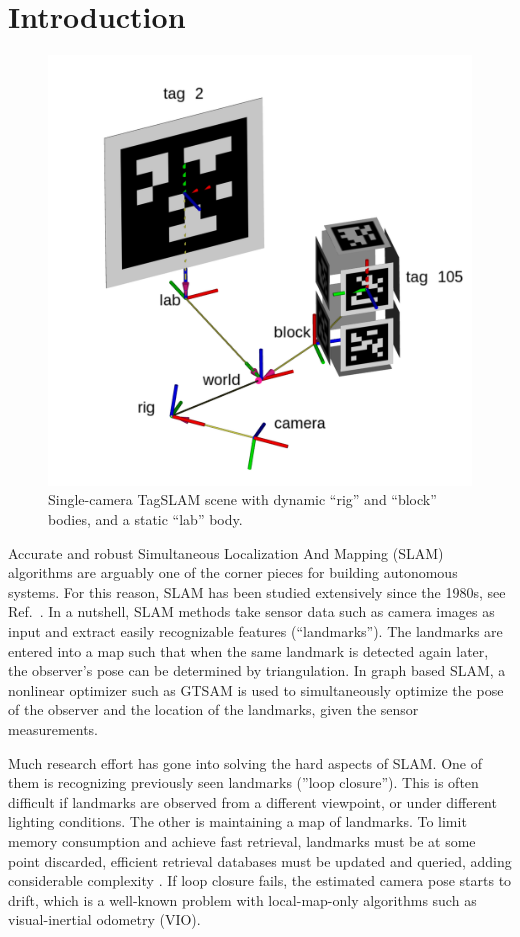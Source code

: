 \section{Introduction}
\begin{figure}[ht]
  \centering
  \includegraphics[width=\columnwidth]{scene_with_block.png}
  \caption{Single-camera TagSLAM scene with dynamic ``rig'' and ``block''
    bodies, and a static ``lab'' body.}
  \label{fig:scene_with_block}
\end{figure}

Accurate and robust Simultaneous Localization And Mapping (SLAM)
algorithms are arguably one of the corner pieces for building
autonomous systems. For this reason, SLAM has been studied extensively
since the 1980s, see Ref.\ \cite{cadena2016}. 
In a nutshell, SLAM methods take sensor data such as camera images as
input and extract easily recognizable features (``landmarks''). The
landmarks are entered into a map such that when the same landmark is
detected again later, the observer's pose can be determined by
triangulation. In graph based SLAM, a nonlinear optimizer such as
GTSAM \cite{kaess2011} is used to simultaneously optimize the pose of
the observer and the location of the landmarks, given the sensor
measurements.

Much research effort \cite{cadena2016} has gone into solving the
hard aspects of SLAM. One of them is recognizing previously seen
landmarks (''loop closure''). This is often difficult if landmarks are
observed from a different viewpoint, or under different lighting
conditions. The other is maintaining a map of landmarks. To limit memory 
consumption and achieve fast retrieval, landmarks must be at some
point discarded, efficient retrieval databases must be updated and
queried, adding considerable complexity \cite{murartal2016}. If loop
closure fails, the estimated camera pose starts to drift, which is a
well-known problem with local-map-only algorithms such as
visual-inertial odometry (VIO).


